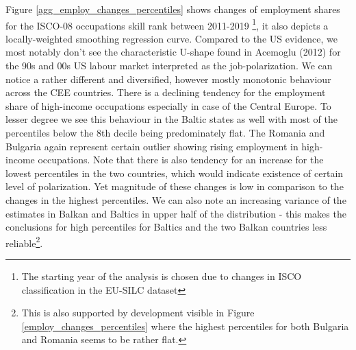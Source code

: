\documentclass{article}
\begin{document}
Figure \ref{agg_employ_changes_percentiles} shows changes of employment shares for the ISCO-08 occupations skill rank between 2011-2019 \footnote{The starting year of the analysis is chosen due to changes in ISCO classification in the EU-SILC dataset}, it also depicts a locally-weighted smoothing regression curve. Compared to the US evidence, we most notably don't see the characteristic U-shape found in Acemoglu (2012) for the 90s and 00s US labour market interpreted as the job-polarization. We can notice a rather different and diversified, however mostly monotonic behaviour across the CEE countries. There is a declining tendency for the employment share of high-income occupations especially in case of the Central Europe. To lesser degree we see this behaviour in the Baltic states as well with most of the percentiles below the 8th decile being predominately flat. The Romania and Bulgaria again represent certain outlier showing rising employment in high-income occupations. Note that there is also tendency for an increase for the lowest percentiles in the two countries, which would indicate existence of certain level of polarization. Yet magnitude of these changes is low in comparison to the changes in the highest percentiles. We can also note an increasing variance of the estimates in Balkan and Baltics in upper half of the distribution - this makes the conclusions for high percentiles for Baltics and the two Balkan countries less reliable\footnote{This is also supported by development visible in Figure \ref{employ_changes_percentiles} where the highest percentiles for both Bulgaria and Romania seems to be rather flat.}.\\
\end{document}
